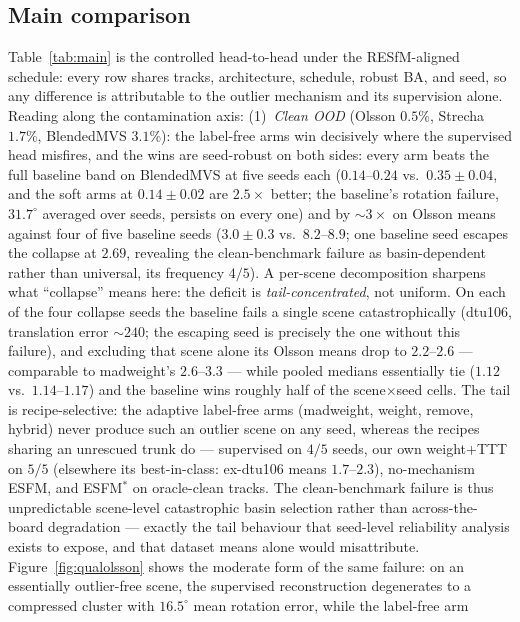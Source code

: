 \documentclass{article}
\newcommand{\mad}{madweight}
\renewcommand{\deg}{^{\circ}}
\begin{document}
\subsection{Main comparison}
Table~\ref{tab:main} is the controlled head-to-head under the RESfM-aligned schedule:
every row shares tracks, architecture, schedule, robust BA, and seed, so any difference is
attributable to the outlier mechanism and its supervision alone. Reading along the
contamination axis:
(1)~\emph{Clean OOD} (Olsson $0.5\%$, Strecha $1.7\%$, BlendedMVS $3.1\%$): the
label-free arms win decisively where the supervised head misfires, and the wins are
seed-robust on both sides: every arm beats the full baseline band on BlendedMVS
at five seeds each ($0.14$--$0.24$ vs.\ $0.35\pm0.04$, and the soft arms at
$0.14\pm0.02$ are $2.5\times$ better; the baseline's rotation failure, $31.7\deg$
averaged over seeds, persists on every one) and by ${\sim}3\times$ on Olsson means against four of five baseline
seeds ($3.0\pm0.3$ vs.\ $8.2$--$8.9$; one baseline seed escapes the collapse at $2.69$,
revealing the clean-benchmark failure as basin-dependent rather than universal, its
frequency $4/5$). A per-scene decomposition sharpens what ``collapse'' means here:
the deficit is \emph{tail-concentrated}, not uniform. On each of the four collapse
seeds the baseline fails a single scene catastrophically (dtu106, translation error
${\sim}240$; the escaping seed is precisely the one without this failure), and
excluding that scene alone its Olsson means drop to $2.2$--$2.6$ --- comparable to
\mad{}'s $2.6$--$3.3$ --- while pooled medians essentially tie ($1.12$ vs.\
$1.14$--$1.17$) and the baseline wins roughly half of the scene$\times$seed cells.
The tail is recipe-selective: the adaptive label-free arms (\mad{}, weight, remove,
hybrid) never produce such an outlier scene on any seed, whereas the recipes sharing
an unrescued trunk do --- supervised on $4/5$ seeds, our own weight+TTT on $5/5$
(elsewhere its best-in-class: ex-dtu106 means $1.7$--$2.3$), no-mechanism ESFM, and
ESFM$^{\ast}$ on oracle-clean tracks. The clean-benchmark failure is thus
unpredictable scene-level catastrophic basin selection rather than across-the-board
degradation --- exactly the tail behaviour that seed-level reliability analysis
exists to expose, and that dataset means alone would misattribute.
Figure~\ref{fig:qualolsson} shows the moderate form of the same failure:
on an essentially outlier-free scene, the supervised reconstruction degenerates to a
compressed cluster with $16.5\deg$ mean rotation error, while the label-free arm
\end{document}
